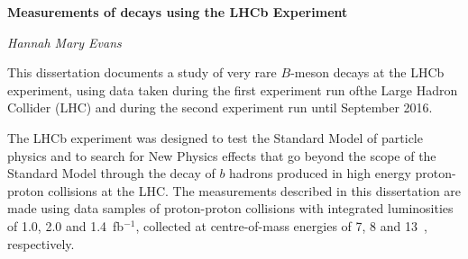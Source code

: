 \begin{titlepage}
 
\begin{center}
 {\LARGE\bfseries Measurements of  decays using the LHCb Experiment \par}
  \vspace{1cm}
  {\Large\itshape Hannah Mary Evans}
\end{center}

  \vspace{2cm}


  \vspace{0.5cm}

\normalsize
This dissertation documents a study of very rare $B$-meson decays at the LHCb experiment, using data taken during the first experiment run ofthe Large Hadron Collider (LHC) and during the second experiment run until September 2016.



The LHCb experiment was designed to test the Standard Model of particle physics and to search for New Physics effects that go beyond the scope of the Standard Model through the decay of $b$ hadrons produced in high energy proton-proton collisions at the LHC. The measurements described in this dissertation are made using data samples of proton-proton collisions with integrated luminosities of 1.0, 2.0 and 1.4~fb$^{-1}$, collected at centre-of-mass energies of 7, 8 and 13~\tev, respectively. %


\end{titlepage}
